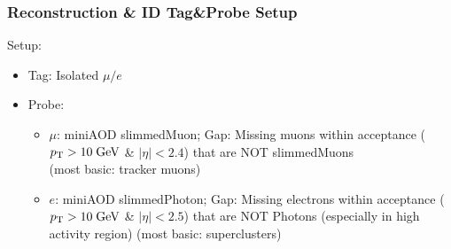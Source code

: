 \documentclass{beamer}
\begin{document}
\begin{frame}
 \frametitle{Reconstruction \& ID Tag\&Probe Setup}
 
 Setup:
 \begin{itemize}
  \item Tag: Isolated $\mu/e$
  \item Probe:
  \begin{itemize}
   \item $\mu$: miniAOD slimmedMuon; Gap: Missing muons within acceptance ($p_{\text{T}}>10\;\text{Ge}\kern-0.06667em\text{V}$ \& $|\eta|<2.4$)  that are NOT slimmedMuons\\ (most basic: tracker muons)
   \item $e$: miniAOD slimmedPhoton; Gap: Missing electrons within acceptance ($p_{\text{T}}>10\;\text{Ge}\kern-0.06667em\text{V}$ \& $|\eta|<2.5$) that are NOT Photons (especially in high activity region) (most basic: superclusters)
  \end{itemize}
 \end{itemize}
\end{frame}
\end{document}
